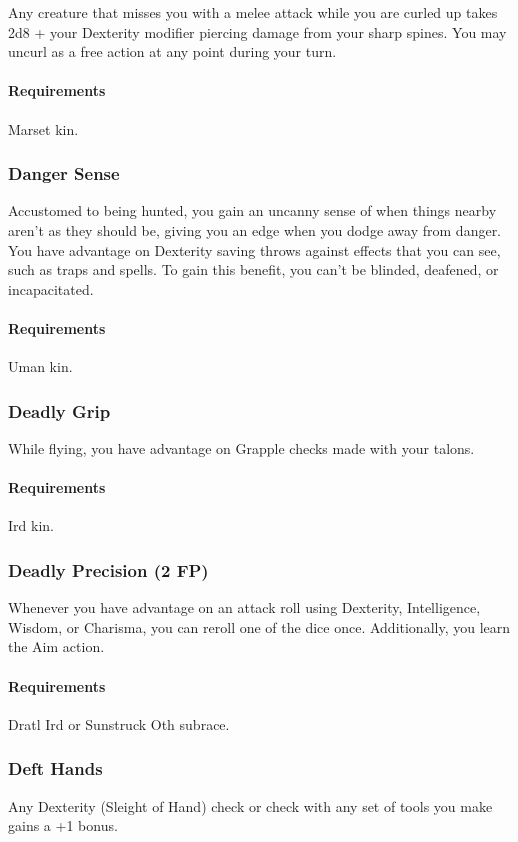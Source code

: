     Any creature that misses you with a melee attack while you are curled up takes 2d8 + your Dexterity modifier piercing damage from your sharp spines.
    You may uncurl as a free action at any point during your turn.
    \paragraph{Requirements} Marset kin.
\subsubsection{Danger Sense} \label{feat::dangersense}
    Accustomed to being hunted, you gain an uncanny sense of when things nearby aren't as they should be, giving you an edge when you dodge away from danger.
    You have advantage on Dexterity saving throws against effects that you can see, such as traps and spells.
    To gain this benefit, you can't be blinded, deafened, or incapacitated.
    \paragraph{Requirements} Uman kin.
\subsubsection{Deadly Grip} \label{feat::deadlygrip}
    While flying, you have advantage on Grapple checks made with your talons.
    \paragraph{Requirements} Ird kin.
\subsubsection{Deadly Precision (2 FP)} \label{feat::deadlyprecision}
    Whenever you have advantage on an attack roll using Dexterity, Intelligence, Wisdom, or Charisma, you can reroll one of the dice once.
    Additionally, you learn the Aim action.
    \paragraph{Requirements} Dratl Ird or Sunstruck Oth subrace.
\subsubsection{Deft Hands} \label{feat::defthands}
    Any Dexterity (Sleight of Hand) check or check with any set of tools you make gains a +1 bonus.

